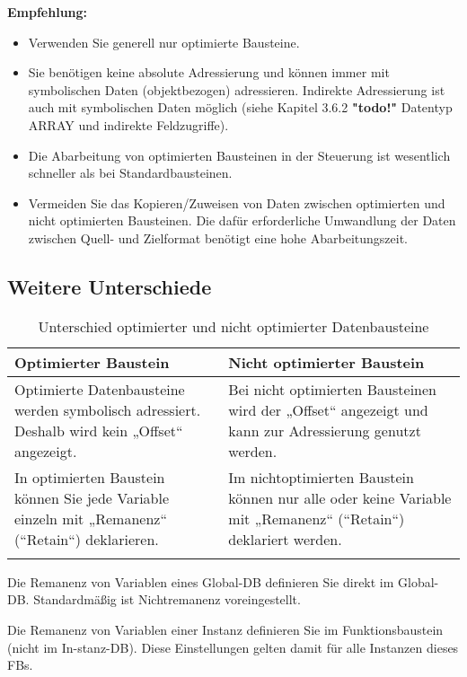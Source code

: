 \clearpage
\textbf{Empfehlung:}\par \noindent
\begin{itemize}
    \item Verwenden Sie generell nur optimierte Bausteine. 
    \item Sie benötigen keine absolute Adressierung und können immer mit symbolischen Daten (objektbezogen) adressieren. Indirekte Adressierung ist auch mit symbolischen Daten möglich (siehe Kapitel 3.6.2 \textbf{"todo!"}  Datentyp ARRAY und indirekte Feldzugriffe).
    \item Die Abarbeitung von optimierten Bausteinen in der Steuerung ist wesentlich schneller als bei Standardbausteinen. 
    \item Vermeiden Sie das Kopieren/Zuweisen von Daten zwischen optimierten und nicht optimierten Bausteinen. Die dafür erforderliche Umwandlung der Daten zwischen Quell- und Zielformat benötigt eine hohe Abarbeitungszeit.
    
\end{itemize}

\subsection{Weitere Unterschiede}\label{subsec:Weitere Unterschiede}
\begin{longtable}{| p{} | p{} | } %
    \hline
    \textbf{Optimierter Baustein} & \textbf{Nicht optimierter Baustein}  \\    
    \hline
    Optimierte Datenbausteine werden symbolisch adressiert. Deshalb wird kein „Offset“ angezeigt. & Bei nicht optimierten Bausteinen wird der „Offset“ angezeigt und kann zur Adressierung genutzt werden.  \\    
    \hline
    In optimierten Baustein können Sie jede Variable einzeln mit „Remanenz“ (“Retain“) deklarieren. & Im nichtoptimierten Baustein können nur alle oder keine Variable mit „Remanenz“ (“Retain“) deklariert werden.\\
    \hline
    \caption{Unterschied optimierter und nicht optimierter Datenbausteine}\label{tab:Unterschied optimierter und nicht optimierter Datenbausteine} %
\end{longtable}
\noindent Die Remanenz von Variablen eines Global-DB definieren Sie direkt im Global-DB. Standardmäßig ist Nichtremanenz voreingestellt.\par \noindent
Die Remanenz von Variablen einer Instanz definieren Sie im Funktionsbaustein (nicht im In-stanz-DB). Diese Einstellungen gelten damit für alle Instanzen dieses FBs.

